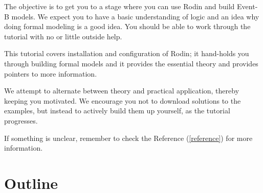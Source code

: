 
The objective is to get you to a stage where you can use Rodin and build Event-B models.  We expect you to have a basic understanding of logic and an idea why doing formal modeling is a good idea.  You should be able to work through the tutorial with no or little outside help.

This tutorial covers installation and configuration of Rodin; it hand-holds you through building formal models and it provides the essential theory and provides pointers to more information.

We attempt to alternate between theory and practical application, thereby keeping you motivated.  We encourage you not to download solutions to the examples, but instead to actively build them up yourself, as the tutorial progresses.

If something is unclear, remember to check the Reference (\ref{reference}) for more information.

\section{Outline}


